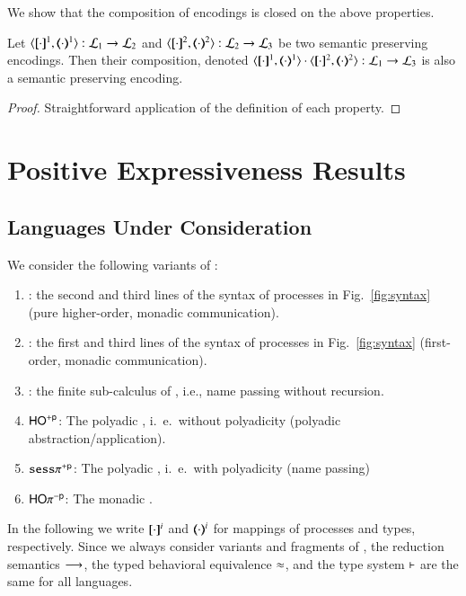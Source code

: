 We show that the composition of encodings is closed on the above properties.

\begin{proposition}
	Let $\encod{\cdot}{\cdot}{1}: \tyl{L}_1 \to \tyl{L}_2$ and $\encod{\cdot}{\cdot}{2}: \tyl{L}_2 \to \tyl{L}_3$
	be two semantic preserving encodings.
	Then their composition, denoted 
	$\encod{\cdot}{\cdot}{1} \cdot \encod{\cdot}{\cdot}{2}: \tyl{L}_1 \to \tyl{L}_3$
	is also a semantic preserving encoding.
\end{proposition}

\begin{proof}
	Straightforward application of the definition of each property.
\end{proof}

\section{Positive Expressiveness Results}

\subsection{Languages Under Consideration}
We consider the following variants of \HOp:
\begin{enumerate}[-]
	\item	\HO: the second and third lines of the syntax of processes in Fig.~\ref{fig:syntax} (pure higher-order, monadic communication).
	\item	\sesp: the first and third lines of the syntax of processes in Fig.~\ref{fig:syntax} (first-order, monadic communication).
	\item	\sespnr: the finite sub-calculus of \sesp, i.e., name passing without recursion.
	\item	$\mathsf{HO}^{+\mathsf{p}}$: The polyadic \HO, i.~e.\ without polyadicity (polyadic abstraction/application).
	\item	$\mathtt{sess}\pi^{+\mathsf{p}}$: The polyadic \sesp, i.~e.\ with polyadicity (name passing)
	\item	$\mathsf{HO}\pi^{-\mathsf{p}}$: The monadic \HOp.
\end{enumerate}
\noindent
In the following we write $[\!\![\cdot]\!\!]^i$
and $(\!\!\langle\cdot\rangle\!\!)^i$ 
for mappings of processes and types, respectively.
Since we always consider variants and fragments of \HOp, the 
reduction semantics $\longrightarrow$, the typed behavioral equivalence $\approx$,
and the type system $\vdash$ are the same for all languages.

